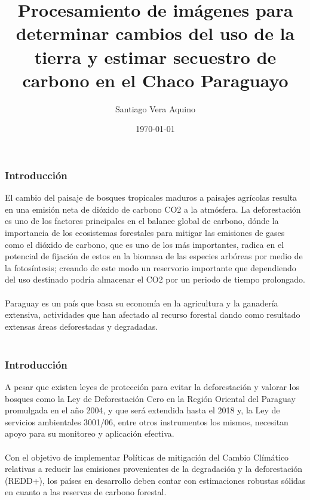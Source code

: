 \documentclass[xcolor=table]{beamer}
\title[Secuestro de Carbono]{Procesamiento de im\'agenes para determinar cambios del uso de la tierra y estimar secuestro de carbono en el Chaco Paraguayo} %
\author{Santiago Vera Aquino} %
\institute[FP-UNA] %
{
Universidad Nacional de Asunci\'on \\ %
\medskip
\textit{sveraaquino@gmail.com} %
}
\date{\today} %
\begin{document}
\begin{frame}
\titlepage %
\end{frame}





\begin{frame}
\frametitle{Introducci\'on}
El cambio del paisaje de bosques tropicales maduros a paisajes agr\'icolas resulta en una emisi\'on neta de di\'oxido de carbono CO2 a la atm\'osfera. La deforestaci\'on es uno de los factores principales en el balance global de carbono, d\'onde la importancia de los ecosistemas forestales para mitigar las emisiones de gases como el di\'oxido de carbono, que es uno de los más importantes, radica en el potencial de fijaci\'on de estos en la biomasa de las especies arb\'oreas por medio de la fotos\'intesis; creando de este modo un reservorio importante que dependiendo del uso destinado podría almacenar el CO2 por un periodo de tiempo prolongado.\\~\\

Paraguay es un pa\'is que basa su econom\'ia en la agricultura y la ganader\'ia extensiva, actividades que han afectado al recurso forestal dando como resultado extensas \'areas deforestadas y degradadas.\\~\\

\end{frame}

\begin{frame}
	\frametitle{Introducci\'on}
	A pesar que existen leyes de protecci\'on para evitar la deforestaci\'on y valorar los bosques como la Ley de Deforestaci\'on Cero en la Regi\'on Oriental del Paraguay promulgada en el a\~{n}o 2004, y que ser\'a extendida hasta el 2018 y, la Ley de servicios ambientales 3001/06, entre otros instrumentos los mismos, necesitan apoyo para su monitoreo y aplicaci\'on efectiva.\\~\\
	
	Con el objetivo de implementar Pol\'iticas de mitigaci\'on del Cambio Cl\'im\'atico relativas a reducir las emisiones provenientes de la degradaci\'on y la deforestaci\'on (REDD+), los pa\'ises en desarrollo deben contar con estimaciones robustas s\'olidas en cuanto a las reservas de carbono forestal.
	
\end{frame}

\end{document}
